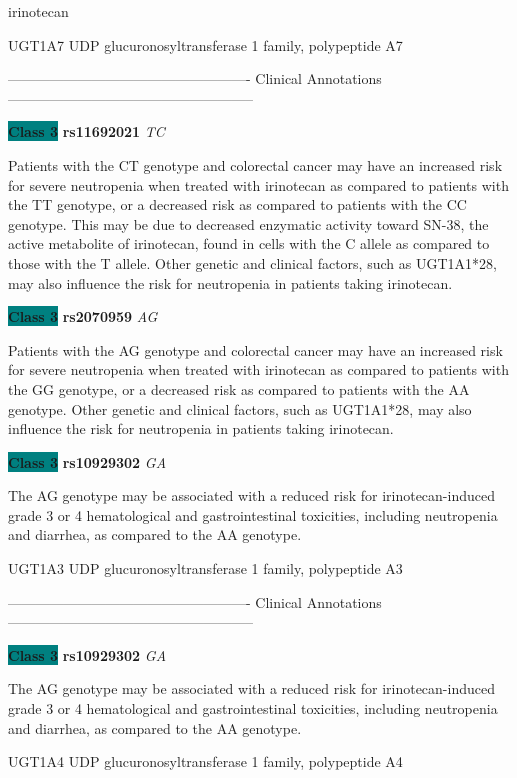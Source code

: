 \documentclass{resume} %
\begin{document}
\begin{rSection}{ irinotecan }
\begin{rSubsection}{ UGT1A7 }{ UDP glucuronosyltransferase 1 family, polypeptide A7 }{}{}
\item[] ---------------------------------------------------- Clinical Annotations -----------------------------------------------------\newline
\item \textbf{\colorbox{teal} {Class 3}} \textbf{ rs11692021 } \textit{ TC }
\item[] Patients with the CT genotype and colorectal cancer may have an increased risk for severe neutropenia when treated with irinotecan as compared to patients with the TT genotype, or a decreased risk as compared to patients with the CC genotype. This may be due to decreased enzymatic activity toward SN-38, the active metabolite of irinotecan, found in cells with the C allele as compared to those with the T allele. Other genetic and clinical factors, such as UGT1A1*28, may also influence the risk for neutropenia in patients taking irinotecan.\item \textbf{\colorbox{teal} {Class 3}} \textbf{ rs2070959 } \textit{ AG }
\item[] Patients with the AG genotype and colorectal cancer may have an increased risk for severe neutropenia when treated with irinotecan as compared to patients with the GG genotype, or a decreased risk as compared to patients with the AA genotype. Other genetic and clinical factors, such as UGT1A1*28, may also influence the risk for neutropenia in patients taking irinotecan.\item \textbf{\colorbox{teal} {Class 3}} \textbf{ rs10929302 } \textit{ GA }
\item[] The AG genotype may be associated with a reduced risk for irinotecan-induced grade 3 or 4 hematological and gastrointestinal toxicities, including neutropenia and diarrhea, as compared to the AA genotype. 
\end{rSubsection}\begin{rSubsection}{ UGT1A3 }{ UDP glucuronosyltransferase 1 family, polypeptide A3 }{}{}
\item[]

\item[] ---------------------------------------------------- Clinical Annotations -----------------------------------------------------\newline
\item \textbf{\colorbox{teal} {Class 3}} \textbf{ rs10929302 } \textit{ GA }
\item[] The AG genotype may be associated with a reduced risk for irinotecan-induced grade 3 or 4 hematological and gastrointestinal toxicities, including neutropenia and diarrhea, as compared to the AA genotype. 
\end{rSubsection}\begin{rSubsection}{ UGT1A4 }{ UDP glucuronosyltransferase 1 family, polypeptide A4 }{}{}
\item[]


\end{rSubsection}
\end{rSection}
\end{document}
